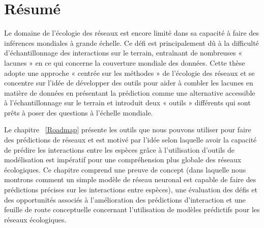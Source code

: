 \documentclass[12pt,twoside,phd]{dms}
\numberwithin{equation}{section}
\numberwithin{table}{chapter}
\numberwithin{figure}{chapter}
\begin{document}

\maketitle

\maketitle


\francais

\chapter*{Résumé}

Le domaine de l’écologie des réseaux est encore limité dans sa capacité à faire des inférences mondiales à grande échelle. Ce défi est principalement dû à la difficulté d’échantillonnage des interactions sur le terrain, entraînant de nombreuses « lacunes » en ce qui concerne la couverture mondiale des données. Cette thèse adopte une approche « centrée sur les méthodes » de l'écologie des réseaux et se concentre sur l'idée de développer des outils pour aider à combler les lacunes en matière de données en présentant la prédiction comme une alternative accessible à l'échantillonnage sur le terrain et introduit deux « outils » différents qui sont prêts à poser des questions à l’échelle mondiale.

Le chapitre ~\ref{Roadmap} présente les outils que nous pouvons utiliser pour faire des prédictions de réseaux et est motivé par l'idée selon laquelle avoir la capacité de prédire les interactions entre les espèces grâce à l'utilisation d'outils de modélisation est impératif pour une compréhension plus globale des réseaux écologiques. Ce chapitre comprend une preuve de concept (dans laquelle nous montrons comment un simple modèle de réseau neuronal est capable de faire des prédictions précises sur les interactions entre espèces), une évaluation des défis et des opportunités associés à l'amélioration des prédictions d'interaction et une feuille de route conceptuelle concernant l'utilisation de modèles prédictifs pour les réseaux écologiques.
\end{document}
